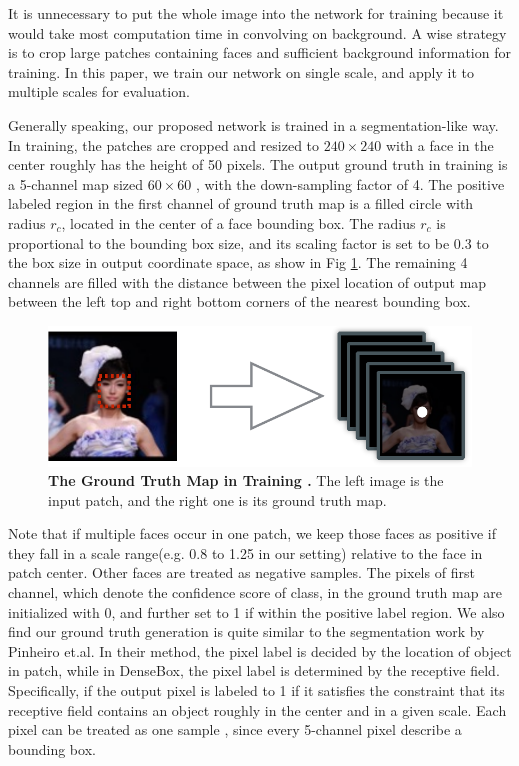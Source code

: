 It is unnecessary to put the whole image into the network for training because it would take most computation time in convolving on background. A wise strategy is to crop large patches containing faces and sufficient background information for training. In this paper, we train our network on single scale, and apply it to multiple scales for evaluation. 

Generally speaking, our proposed network is trained in a segmentation-like way.   In training, the patches are cropped and resized to $240 \times 240$ with a face in the center roughly has the height of 50 pixels. The output ground truth in training is a 5-channel map sized $60 \times 60 $ , with the down-sampling factor of 4. The positive labeled region in the first channel of ground truth map is a filled circle with radius $r_c$, located in the center of a face bounding box. The radius $r_c$ is proportional to the bounding box size, and its scaling factor is set to be 0.3 to the box size in output coordinate space, as show in Fig \ref{fig:fig_gt}. The remaining 4 channels are filled with the distance between the pixel location of output map between the left top and right bottom corners of the nearest bounding box.  


	\begin{figure}[!hbtp]
	\centering
	 \includegraphics[scale=0.55]{figures/figure2-crop.pdf}
	\caption{\textbf{The Ground Truth Map in Training .} The left image is the input patch, and the right one is its ground truth map. }
	\label{fig:fig_gt}
	\end{figure}

Note that if multiple faces occur in one patch, we keep those faces as positive if they fall in a scale range(e.g. 0.8 to 1.25 in our setting) relative to the face in patch center. Other faces are treated as negative samples. The pixels of first channel, which denote the confidence score of class, in the ground truth map are initialized with 0, and further set to 1 if within the positive label region.  We also find our ground truth generation is quite similar to the segmentation work\cite{pinheiro2015learning} by Pinheiro et.al.   In their method, the pixel label is decided by the location of object in patch, while in DenseBox, the pixel label is determined by the receptive field. Specifically, if the output pixel is labeled to 1 if it satisfies the constraint that its receptive field contains an object roughly in the center and in a given scale. Each pixel can be treated as one sample , since every 5-channel pixel describe a bounding box.


